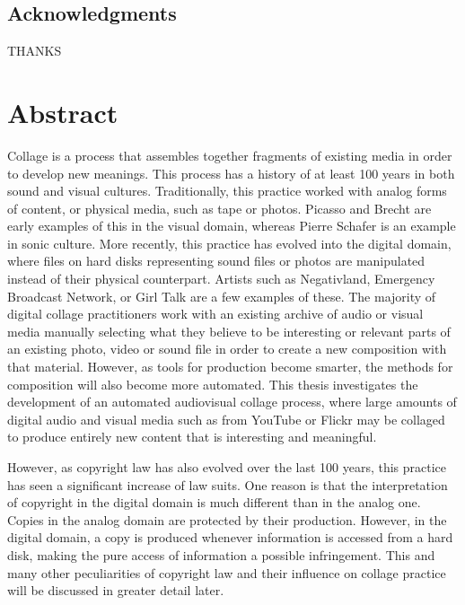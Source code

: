\documentclass[a4paper,11pt,twoside]{ThesisStyle}
\begin{document}

\dominitoc
{}
 \cleardoublepage
\section*{Acknowledgments}
THANKS

\tableofcontents
\mainmatter

\cleardoublepage
\chapter*{Abstract}
Collage is a process that assembles together fragments of existing media in order to develop new meanings.  This process has a history of at least 100 years in both sound and visual cultures.  Traditionally, this practice worked with analog forms of content, or physical media, such as tape or photos.  Picasso and Brecht are early examples of this in the visual domain, whereas Pierre Schafer is an example in sonic culture.  More recently, this practice has evolved into the digital domain, where files on hard disks representing sound files or photos are manipulated instead of their physical counterpart.  Artists such as Negativland, Emergency Broadcast Network, or Girl Talk are a few examples of these.  The majority of digital collage practitioners work with an existing archive of audio or visual media manually selecting what they believe to be interesting or relevant parts of an existing photo, video or sound file in order to create a new composition with that material.  However, as tools for production become smarter, the methods for composition will also become more automated.  This thesis investigates the development of an automated audiovisual collage process, where large amounts of digital audio and visual media such as from YouTube or Flickr may be collaged to produce entirely new content that is interesting and meaningful.

However, as copyright law has also evolved over the last 100 years, this practice has seen a significant increase of law suits.  One reason is that the interpretation of copyright in the digital domain is much different than in the analog one.  Copies in the analog domain are protected by their production.  However, in the digital domain, a copy is produced whenever information is accessed from a hard disk, making the pure access of information a possible infringement.  This and many other peculiarities of copyright law and their influence on collage practice will be discussed in greater detail later.  
\end{document}
